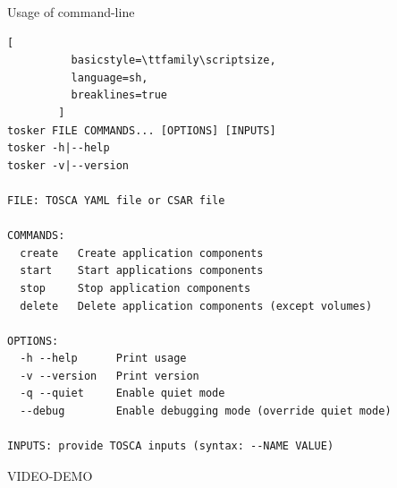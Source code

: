 \documentclass{beamer}
\begin{document}
  \begin{frame}[containsverbatim]{Usage of \dt command-line}
        \begin{lstlisting}[
          basicstyle=\ttfamily\scriptsize,
          language=sh,
          breaklines=true
        ]
tosker FILE COMMANDS... [OPTIONS] [INPUTS]
tosker -h|--help
tosker -v|--version

FILE: TOSCA YAML file or CSAR file

COMMANDS:
  create   Create application components
  start    Start applications components
  stop     Stop application components
  delete   Delete application components (except volumes)

OPTIONS:
  -h --help      Print usage
  -v --version   Print version
  -q --quiet     Enable quiet mode
  --debug        Enable debugging mode (override quiet mode)

INPUTS: provide TOSCA inputs (syntax: --NAME VALUE)
        \end{lstlisting}
  \end{frame}

  \begin{frame}
    \centering
    \Huge VIDEO-DEMO
  \end{frame}
\end{document}
